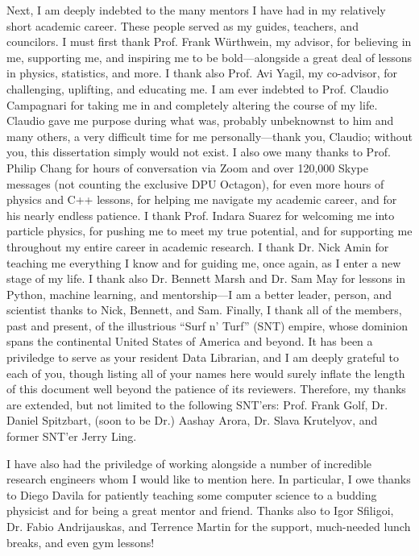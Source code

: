 \begin{acknowledgements}
Next, I am deeply indebted to the many mentors I have had in my relatively short academic career. 
These people served as my guides, teachers, and councilors. 
I must first thank Prof. Frank W\"urthwein, my advisor, for believing in me, supporting me, and inspiring me to be bold---alongside a great deal of lessons in physics, statistics, and more. 
I thank also Prof. Avi Yagil, my co-advisor, for challenging, uplifting, and educating me. 
I am ever indebted to Prof. Claudio Campagnari for taking me in and completely altering the course of my life. 
Claudio gave me purpose during what was, probably unbeknownst to him and many others, a very difficult time for me personally---thank you, Claudio; without you, this dissertation simply would not exist. 
I also owe many thanks to Prof. Philip Chang for hours of conversation via Zoom and over 120,000 Skype messages (not counting the exclusive DPU Octagon), for even more hours of physics and C++ lessons, for helping me navigate my academic career, and for his nearly endless patience. 
I thank Prof. Indara Suarez for welcoming me into particle physics, for pushing me to meet my true potential, and for supporting me throughout my entire career in academic research. 
I thank Dr. Nick Amin for teaching me everything I know and for guiding me, once again, as I enter a new stage of my life. 
I thank also Dr. Bennett Marsh and Dr. Sam May for lessons in Python, machine learning, and mentorship---I am a better leader, person, and scientist thanks to Nick, Bennett, and Sam. 
Finally, I thank all of the members, past and present, of the illustrious ``Surf n' Turf'' (SNT) empire, whose dominion spans the continental United States of America and beyond. 
It has been a priviledge to serve as your resident Data Librarian, and I am deeply grateful to each of you, though listing all of your names here would surely inflate the length of this document well beyond the patience of its reviewers. 
Therefore, my thanks are extended, but not limited to the following SNT'ers: Prof. Frank Golf, Dr. Daniel Spitzbart, (soon to be Dr.) Aashay Arora, Dr. Slava Krutelyov, and former SNT'er Jerry Ling.

I have also had the priviledge of working alongside a number of incredible research engineers whom I would like to mention here. 
In particular, I owe thanks to Diego Davila for patiently teaching some computer science to a budding physicist and for being a great mentor and friend. 
Thanks also to Igor Sfiligoi, Dr. Fabio Andrijauskas, and Terrence Martin for the support, much-needed lunch breaks, and even gym lessons! 


\end{acknowledgements}
